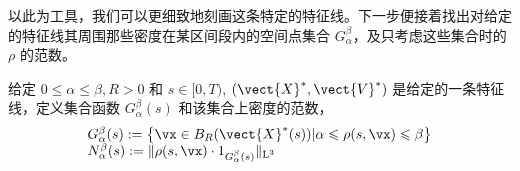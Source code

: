 
以此为工具，我们可以更细致地刻画这条特定的特征线。下一步便接着找出对给定的特征线其周围那些密度在某区间段内的空间点集合 $G_{\alpha}^{\beta}$，及只考虑这些集合时的 $\rho$ 的范数。
\begin{definition}
  给定 $0 \leqslant \alpha \leqslant \beta, R>0$ 和 $s \in[0, T)$, $(\vect{X}^*, \vect{V}^*)$ 是给定的一条特征线，定义集合函数 $G_{\alpha}^{\beta}(s)$ 和该集合上密度的范数，
\[
\begin{array}{l}
G_{\alpha}^{\beta}(s):=\left\{\vx \in B_{R}(\vect{X}^*(s)) | \alpha \leqslant \rho(s, \vx) \leqslant \beta\right\} \\
N_{\alpha}^{\beta}(s):=\|\rho(s, \vx) \cdot 1_{G_{\alpha}^{\beta}(s)}\|_{\mathrm{L}^3}
\end{array}
\]
\end{definition}




